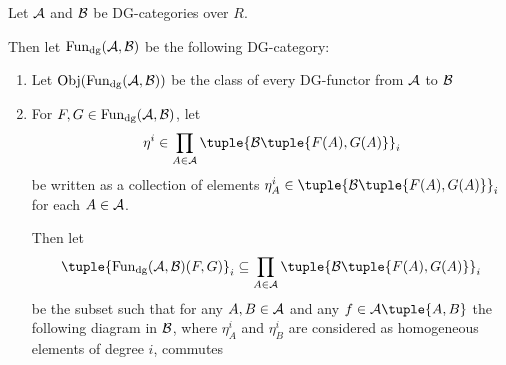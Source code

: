 \begin{definition}[\( \Fun_{\dg}(\Ac, \Bc) \)]
    \label{def:dg_functor_category}
    Let \( {\mathcal{A}} \) and \( {\mathcal{B}} \) be DG-categories over \( R \).

    Then let \( \Fun_{\dg}(\Ac, \Bc) \) be the following DG-category:
    \begin{enumerate}
        \item{
            Let \( \operatorname{Obj}(\operatorname{Fun}_{\operatorname{dg}}({\mathcal{A}}, {\mathcal{B}})) \) be the class of every DG-functor from \( {\mathcal{A}} \) to \( {\mathcal{B}} \)
        }
        \item{
            For \( F, G \in \operatorname{Fun}_{\operatorname{dg}}({\mathcal{A}}, {\mathcal{B}}) \), let
            \[
                \eta^i \in \prod_{A \in \Ac} \tuple{\Bc\tuple{F(A), G(A)}}_i
            \]
            be written as a collection of elements \( \eta_A^i \in \tuple{\Bc\tuple{F(A), G(A)}}_i \) for each \( A \in {\mathcal{A}} \).
            
            Then let
            \[
                \tuple{\Fun_{\dg}(\Ac, \Bc)(F, G)}_i
                \subseteq \prod_{A \in \Ac} \tuple{\Bc\tuple{F(A), G(A)}}_i
            \]
            be the subset such that for any \( A, B \in {\mathcal{A}} \) and any \( f \in \Ac\tuple{A, B} \) the following diagram in \( {\mathcal{B}} \), where \( \eta_A^i \) and \( \eta_B^i \) are considered as homogeneous elements of degree \( i \), commutes
            \begin{center}
            \end{center}

}
\end{enumerate}
\end{definition}
